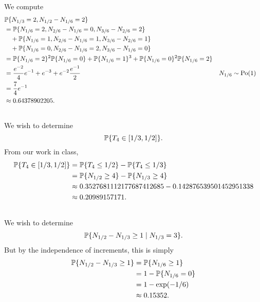 \documentclass[10pt]{article}
\DeclarePairedDelimiter{\set}{\lbrace}{\rbrace}
\DeclareMathOperator{\Po}{Po}
\renewcommand{\P}{\mathbb{P}}
\begin{document}
\subsection{}
We compute
\begin{align*}
  &\P\set{N_{1/3} = 2, N_{1/2} - N_{1/6} = 2} \\
  &= \P\set{N_{1/6} = 2, N_{2/6} - N_{1/6}=0, N_{3/6}-N_{2/6} = 2} \\
  &\quad + \P\set{N_{1/6} = 1, N_{2/6} - N_{1/6}=1, N_{3/6}-N_{2/6} = 1} \\
  &\quad + \P\set{N_{1/6} = 0, N_{2/6} - N_{1/6}=2, N_{3/6}-N_{1/6} = 0} \\
  &= \P\set{N_{1/6}=2}^2 \P\set{N_{1/6}=0}
  + \P\set{N_{1/6}=1}^3
  + \P\set{N_{1/6}=0}^2 \P\set{N_{1/6}=2} \\
  &= \frac{e^{-2}}{4} e^{-1} 
  + e^{-3}
  + e^{-2} \frac{e^{-1}}{2} &&N_{1/6}\sim \Po(1) \\
  &= \frac74 e^{-1} \\
  &\approx 0.64378902205.
\end{align*}

\subsection{}
We wish to determine
\[
  \P\set{T_4\in [1/3, 1/2]}.
\]
From our work in class,
\begin{align*}
  \P\set{T_4\in [1/3, 1/2]}
  &= \P\set{T_4\leq 1/2} - \P\set{T_4\leq 1/3} \\
  &= \P\set{N_{1/2}\geq 4} - \P\set{N_{1/3}\geq 4} \\
  &\approx 0.3527681112177687412685 - 0.142876539501452951338 \\
  &\approx 0.20989157171.
\end{align*}

\subsection{}
We wish to determine
\[
  \P\set{N_{1/2} - N_{1/3}\geq 1 \mid N_{1/3} = 3}.
\]
But by the independence of increments,
this is simply
\begin{align*}
  \P\set{N_{1/2} - N_{1/3} \geq 1}
  &= \P\set{N_{1/6} \geq 1} \\
  &= 1- \P\set{N_{1/6} = 0} \\
  &= 1 - \exp(-1/6) \\
  &\approx 0.15352.
\end{align*}
\end{document}
